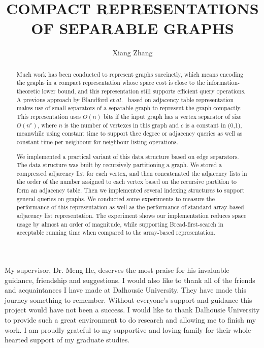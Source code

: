 \documentclass[12pt,glossary]{dalthesis}
\begin{document}
\macs  %
\title{COMPACT REPRESENTATIONS OF SEPARABLE GRAPHS}
\author{Xiang Zhang}





\frontmatter





\begin{abstract}
Much work has been conducted to represent graphs succinctly, which means encoding the graphs in a compact representation whose space cost is close to the information-theoretic lower bound, and this representation still supports efficient query operations. A previous approach by Blandford $et \ al.$~\cite{compact-representation} based on adjacency table representation makes use of small separators of a separable graph to represent the graph compactly. This representation uses $O(n)$ bits if the input graph has a vertex separator of size $O(n^{c})$, where $n$ is the number of vertexes in this graph and $c$ is a constant in (0,1), meanwhile using constant time to support thee degree or adjacency queries as well as constant time per neighbour for neighbour listing operations.


We implemented a practical variant of this data structure based on edge separators. The data structure was built by recursively partitioning a graph. We stored a compressed adjacency list for each vertex, and then concatenated the adjacency lists in the order of the number assigned to each vertex based on the recursive partition to form an adjacency table. Then we implemented several indexing structures to support general queries on graphs. We conducted some experiments to measure the performance of this representation as well as the performance of standard array-based adjacency list representation. The experiment shows our implementation reduces space usage by almost an order of magnitude, while supporting Bread-first-search in acceptable running time when compared to the array-based representation.
\end{abstract}

\printglossary

\begin{acknowledgements}
My supervisor, Dr. Meng He, deserves the most praise for his invaluable guidance, friendship and suggestions. I would also like to thank all of the friends and acquaintances I have made at Dalhousie University. They have made this journey something to remember. Without everyone’s support and guidance this project would have not been a success.
I would like to thank Dalhousie University to provide such a great environment
to do research and allowing me to finish my work.
I am proudly grateful to my supportive and loving family for their whole-hearted
support of my graduate studies.
\end{acknowledgements}
\end{document}
